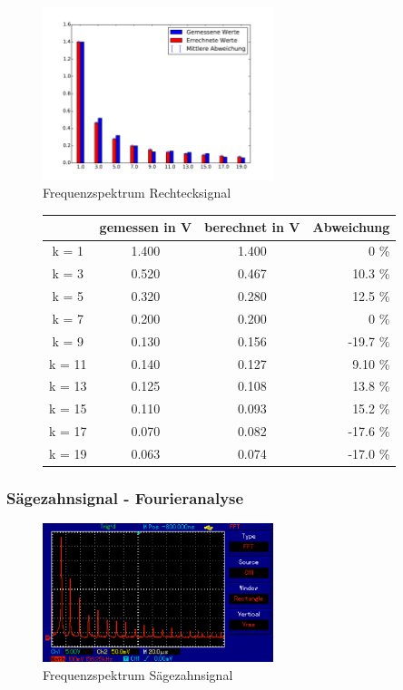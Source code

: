\begin{figure}[h!]
	\centering
	\includegraphics[width=0.6\textwidth]{Rechteck_Fourier.pdf}
	\caption{Frequenzspektrum Rechtecksignal}
	\label{Fourier_Rechteck}
\end{figure}

\begin{figure}[h!]
	\centering
	\begin{tabular}{c|ccr}
		& gemessen in V & berechnet in V & Abweichung \\
		\hline
		k = 1 & 1.400   & 1.400       &  0   \%      \\
		k = 3 & 0.520  & 0.467 &  10.3 \%  \\
		k = 5 & 0.320  & 0.280      &  12.5  \%    \\
		k = 7 & 0.200   & 0.200       &  0  \%        \\
		k = 9 & 0.130  & 0.156  & -19.7 \%  \\
		k = 11 & 0.140  & 0.127  &  9.10 \% \\
		k = 13 & 0.125 & 0.108  &  13.8 \%  \\
		k = 15 & 0.110  & 0.093 &  15.2 \% \\
		k = 17 & 0.070  & 0.082 & -17.6 \%  \\
		k = 19 & 0.063 & 0.074 & -17.0 \% \\
	\end{tabular}
	\label{tab:Rechteck}
\end{figure}




\subsubsection{Sägezahnsignal - Fourieranalyse}
\begin{figure}[h!]
	\centering
	\includegraphics[width=0.6\textwidth]{Saegezahn.png}
	\caption{Frequenzspektrum Sägezahnsignal}
	\label{Frequenz_Saege}
\end{figure}

